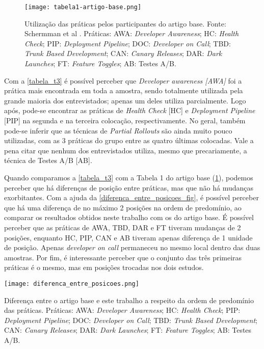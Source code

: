 \begin{figure}[ht]
\begin{center}
\texttt{[image: tabela1-artigo-base.png]}
\end{center}
\caption[Tabela 1 do artigo base]{
    Utilização das práticas pelos participantes do artigo base.
    Fonte: Schermman et al \cite{empiricalStudy2016}. Práticas: AWA: \emph{Developer Awareness}; HC: \emph{Health Check}; PIP: \emph{Deployment Pipeline}; DOC: \emph{Developer on Call}; TBD: \emph{Trunk Based Development}; CAN: \emph{Canary Releases}; DAR: \emph{Dark Launches}; FT: \emph{Feature Toggles}; AB: Testes A/B.
}\label{tabela_1_artigo_base}
\end{figure}

Com a \ref{tabela_t3} é possível perceber que \emph{Developer awareness [AWA]} foi a prática mais encontrada em toda a amostra, sendo totalmente utilizada pela grande maioria dos entrevistados; apenas um deles utiliza parcialmente. Logo após, pode-se encontrar as práticas de \emph{Health Check} [HC] e \emph{Deployment Pipeline} [PIP] na segunda e na terceira colocação, respectivamente. No geral, também pode-se inferir que as técnicas de \emph{Partial Rollouts} são ainda muito pouco utilizadas, com as 3 práticas do grupo entre as quatro últimas colocadas. Vale a pena citar que nenhum dos entrevistados utiliza, mesmo que precariamente, a técnica de Testes A/B [AB].

Quando comparamos a \ref{tabela_t3} com a Tabela 1 do artigo base (\ref{tabela_1_artigo_base}), podemos perceber que há diferenças de posição entre práticas, mas que não há mudanças exorbitantes. Com a ajuda da \ref{diferenca_entre_posicoes_fig}, é possível perceber que há uma diferença de no máximo 2 posições na ordem de predomínio, ao comparar os resultados obtidos neste trabalho com os do artigo base. É possível perceber que as práticas de AWA, TBD, DAR e FT tiveram mudanças de 2 posições, enquanto HC, PIP, CAN e AB tiveram apenas diferença de 1 unidade de posição. Apenas \emph{developer on call} permaneceu no mesmo local dentro das duas amostras. Por fim, é interessante perceber que o conjunto das três primeiras práticas é o mesmo, mas em posições trocadas nos dois estudos.

\begin{table}[ht]
\begin{center}
\texttt{[image: diferenca\_entre\_posicoes.png]}
\end{center}
\caption[Diferença entre a ordem de predomínio das práticas]{
    Diferença entre o artigo base e este trabalho a respeito da ordem de predomínio das práticas. Práticas: AWA: \emph{Developer Awareness}; HC: \emph{Health Check}; PIP: \emph{Deployment Pipeline}; DOC: \emph{Developer on Call}; TBD: \emph{Trunk Based Development}; CAN: \emph{Canary Releases}; DAR: \emph{Dark Launches}; FT: \emph{Feature Toggles}; AB: Testes A/B.
}\label{diferenca_entre_posicoes_fig}
\end{table}

